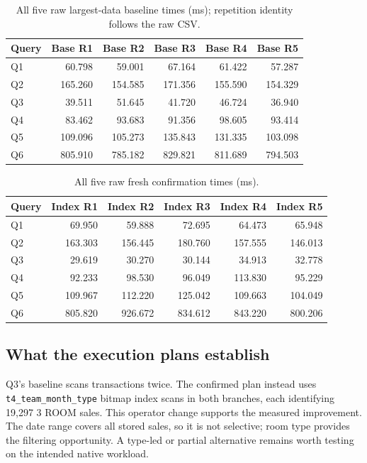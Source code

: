 \begin{table}[H]\centering\small
\begin{tabular}{lrrrrr}
\toprule
Query & Base R1 & Base R2 & Base R3 & Base R4 & Base R5 \\
\midrule
Q1 & 60.798 & 59.001 & 67.164 & 61.422 & 57.287 \\
Q2 & 165.260 & 154.585 & 171.356 & 155.590 & 154.329 \\
Q3 & 39.511 & 51.645 & 41.720 & 46.724 & 36.940 \\
Q4 & 83.462 & 93.683 & 91.356 & 98.605 & 93.414 \\
Q5 & 109.096 & 105.273 & 135.843 & 131.335 & 103.098 \\
Q6 & 805.910 & 785.182 & 829.821 & 811.689 & 794.503 \\
\bottomrule
\end{tabular}
\caption{All five raw largest-data baseline times (ms); repetition identity follows the raw CSV.}
\end{table}

\begin{table}[H]\centering\small
\begin{tabular}{lrrrrr}
\toprule
Query & Index R1 & Index R2 & Index R3 & Index R4 & Index R5 \\
\midrule
Q1 & 69.950 & 59.888 & 72.695 & 64.473 & 65.948 \\
Q2 & 163.303 & 156.445 & 180.760 & 157.555 & 146.013 \\
Q3 & 29.619 & 30.270 & 30.144 & 34.913 & 32.778 \\
Q4 & 92.233 & 98.530 & 96.049 & 113.830 & 95.229 \\
Q5 & 109.967 & 112.220 & 125.042 & 109.663 & 104.049 \\
Q6 & 805.820 & 926.672 & 834.612 & 843.220 & 800.206 \\
\bottomrule
\end{tabular}
\caption{All five raw fresh confirmation times (ms).}
\end{table}

\subsection{What the execution plans establish}
Q3's baseline scans transactions twice. The confirmed plan instead uses \texttt{t4\_team\_month\_type} bitmap index scans in both branches, each identifying 19,297 3 ROOM sales. This operator change supports the measured improvement. The date range covers all stored sales, so it is not selective; room type provides the filtering opportunity. A type-led or partial alternative remains worth testing on the intended native workload.

